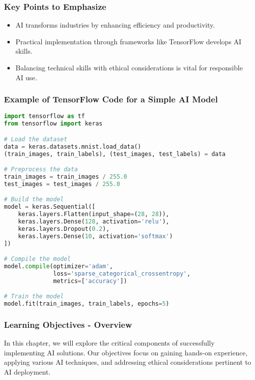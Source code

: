 \documentclass[aspectratio=169]{beamer}
\begin{document}
\begin{frame}[fragile]
    \frametitle{Key Points to Emphasize}
    \begin{itemize}
        \item AI transforms industries by enhancing efficiency and productivity.
        \item Practical implementation through frameworks like TensorFlow develops AI skills.
        \item Balancing technical skills with ethical considerations is vital for responsible AI use.
    \end{itemize}
\end{frame}

\begin{frame}[fragile]
    \frametitle{Example of TensorFlow Code for a Simple AI Model}
    \begin{lstlisting}[language=Python]
import tensorflow as tf
from tensorflow import keras

# Load the dataset
data = keras.datasets.mnist.load_data()
(train_images, train_labels), (test_images, test_labels) = data

# Preprocess the data
train_images = train_images / 255.0
test_images = test_images / 255.0

# Build the model
model = keras.Sequential([
    keras.layers.Flatten(input_shape=(28, 28)),
    keras.layers.Dense(128, activation='relu'),
    keras.layers.Dropout(0.2),
    keras.layers.Dense(10, activation='softmax')
])

# Compile the model
model.compile(optimizer='adam',
              loss='sparse_categorical_crossentropy',
              metrics=['accuracy'])

# Train the model
model.fit(train_images, train_labels, epochs=5)
    \end{lstlisting}
\end{frame}

\begin{frame}[fragile]
    \frametitle{Learning Objectives - Overview}
    In this chapter, we will explore the critical components of successfully implementing AI solutions. Our objectives focus on gaining hands-on experience, applying various AI techniques, and addressing ethical considerations pertinent to AI deployment.
\end{frame}
\end{document}
